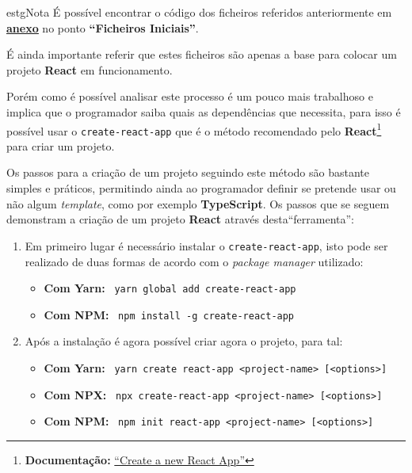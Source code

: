 \begin{enumerate}
	\vspace{0.25cm}
	\begin{mybox}{estg}{Nota}
		É possível encontrar o código dos ficheiros referidos anteriormente em \underline{\textbf{\hyperref[reactFiles]{anexo}}} no ponto \textbf{``Ficheiros Iniciais''}.

		É ainda importante referir que estes ficheiros são apenas a base para colocar um projeto \textbf{React} em funcionamento.
	\end{mybox}
\end{enumerate}

Porém como é possível analisar este processo é um pouco mais trabalhoso e implica que o programador saiba quais as dependências que necessita, para isso é possível usar o \texttt{create-react-app} que é o método recomendado pelo \textbf{React}\footnote{\textbf{Documentação:} \href{https://reactjs.org/docs/create-a-new-react-app.html}{``Create a new React App''}} para criar um projeto.

Os passos para a criação de um projeto seguindo este método são bastante simples e práticos, permitindo ainda ao programador definir se pretende usar ou não algum \textit{template}, como por exemplo \textbf{TypeScript}. Os passos que se seguem demonstram a criação de um projeto \textbf{React} através desta``ferramenta'':

\begin{enumerate}
	\item Em primeiro lugar é necessário instalar o \texttt{create-react-app}, isto pode ser realizado de duas formas de acordo com o \textit{package manager} utilizado:
	\begin{itemize}
		\item \textbf{Com Yarn:} ~\texttt{yarn global add create-react-app}
		\item \textbf{Com NPM:} ~\texttt{npm install -g create-react-app}
	\end{itemize}
	\item Após a instalação é agora possível criar agora o projeto, para tal:
	\begin{itemize}
		\item \textbf{Com Yarn:} ~\texttt{yarn create react-app <project-name> [<options>]}
		\item \textbf{Com NPX:} ~\texttt{npx create-react-app <project-name> [<options>]}
		\item \textbf{Com NPM:} ~\texttt{npm init react-app <project-name> [<options>]}
	\end{itemize}
\end{enumerate}

